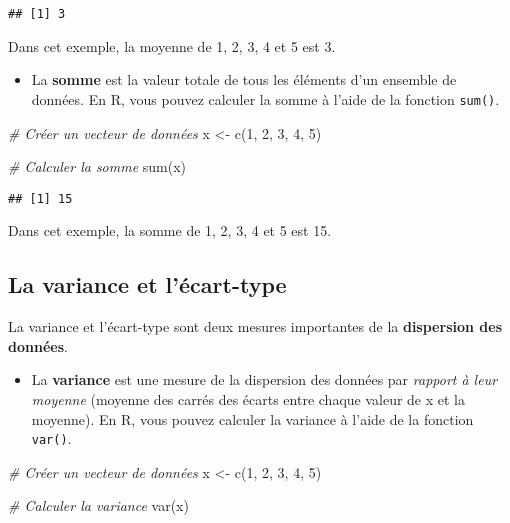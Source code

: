 \documentclass[
]{article}
\newenvironment{Shaded}{\begin{snugshade}}{\end{snugshade}}
\newcommand{\CommentTok}[1]{\textcolor[rgb]{0.56,0.35,0.01}{\textit{#1}}}
\newcommand{\DecValTok}[1]{\textcolor[rgb]{0.00,0.00,0.81}{#1}}
\newcommand{\FunctionTok}[1]{\textcolor[rgb]{0.00,0.00,0.00}{#1}}
\newcommand{\NormalTok}[1]{#1}
\newcommand{\OtherTok}[1]{\textcolor[rgb]{0.56,0.35,0.01}{#1}}
\providecommand{\tightlist}{%
  \setlength{\itemsep}{0pt}\setlength{\parskip}{0pt}}
\begin{document}
\begin{verbatim}
## [1] 3
\end{verbatim}

Dans cet exemple, la moyenne de 1, 2, 3, 4 et 5 est 3.

\begin{itemize}
\tightlist
\item
  La \textbf{somme} est la valeur totale de tous les éléments d'un ensemble de données. En R, vous pouvez calculer la somme à l'aide de la fonction \texttt{sum()}.
\end{itemize}

\begin{Shaded}
\begin{Highlighting}[]
\CommentTok{\# Créer un vecteur de données}
\NormalTok{x }\OtherTok{\textless{}{-}} \FunctionTok{c}\NormalTok{(}\DecValTok{1}\NormalTok{, }\DecValTok{2}\NormalTok{, }\DecValTok{3}\NormalTok{, }\DecValTok{4}\NormalTok{, }\DecValTok{5}\NormalTok{)}

\CommentTok{\# Calculer la somme}
\FunctionTok{sum}\NormalTok{(x)}
\end{Highlighting}
\end{Shaded}

\begin{verbatim}
## [1] 15
\end{verbatim}

Dans cet exemple, la somme de 1, 2, 3, 4 et 5 est 15.

\hypertarget{la-variance-et-luxe9cart-type}{%
\subsection{La variance et l'écart-type}\label{la-variance-et-luxe9cart-type}}

La variance et l'écart-type sont deux mesures importantes de la \textbf{dispersion des données}.

\begin{itemize}
\tightlist
\item
  La \textbf{variance} est une mesure de la dispersion des données par \emph{rapport à leur moyenne} (moyenne des carrés des écarts entre chaque valeur de x
  et la moyenne). En R, vous pouvez calculer la variance à l'aide de la fonction \texttt{var()}.
\end{itemize}

\begin{Shaded}
\begin{Highlighting}[]
\CommentTok{\# Créer un vecteur de données}
\NormalTok{x }\OtherTok{\textless{}{-}} \FunctionTok{c}\NormalTok{(}\DecValTok{1}\NormalTok{, }\DecValTok{2}\NormalTok{, }\DecValTok{3}\NormalTok{, }\DecValTok{4}\NormalTok{, }\DecValTok{5}\NormalTok{)}

\CommentTok{\# Calculer la variance}
\FunctionTok{var}\NormalTok{(x)}
\end{Highlighting}
\end{Shaded}
\end{document}
